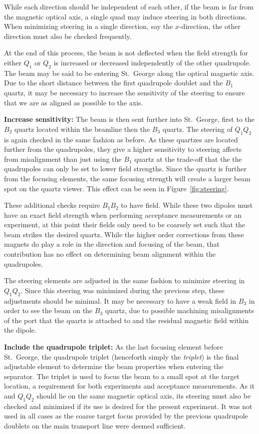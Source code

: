 While each direction should be independent of each other, if the beam is
far from the magnetic optical axis, a single quad may induce steering in
both directions. When minimizing steering in a single direction, say the
$x$-direction, the other direction must also be checked frequently.

At the end of this process, the beam is not deflected when the field
strength for either $Q_1$ or $Q_2$ is increased or decreased
independently of the other quadrupole. The beam may be said to be
entering St.\ George along the optical magnetic axis. Due to the short
distance between the first quadrupole doublet and the $B_1$ quartz, it
may be necessary to increase the sensitivity of the steering to ensure
that we are as aligned as possible to the axis.

\textbf{Increase sensitivity:}
The beam is then sent further into St.\ George, first to the $B_2$
quartz located within the beamline then the $B_3$ quartz. The steering
of $Q_1Q_2$ is again checked in the same fashion as before. As these
quartzes are located further from the quadrupoles, they give a higher
sensitivity to steering affects from misalignment than just using the
$B_1$ quartz at the trade-off that the the quadrupoles can only be set
to lower field strengths. Since the quartz is further from the focusing
elements, the same focusing strength will create a larger beam spot on
the quartz viewer. This effect can be seen in Figure~\ref{fig:steering}.

These additional checks require $B_1B_2$ to have field. While these two
dipoles must have an exact field strength when performing acceptance
measurements or an experiment, at this point their fields only need to
be coarsely set such that the beam strikes the desired quartz. While the
higher order corrections from these magnets do play a role in the
direction and focusing of the beam, that contribution has no effect on
determining beam alignment within the quadrupoles.

The steering elements are adjusted in the same fashion to minimize
steering in $Q_1Q_2$. Since this steering was minimized during the
previous step, these adjustments should be minimal. It may be necessary
to have a weak field in $B_3$ in order to see the beam on the $B_3$
quartz, due to possible machining misalignments of the port that the
quartz is attached to and the residual magnetic field within the dipole.

\textbf{Include the quadrupole triplet:}
As the last focusing element before St.\ George, the quadrupole triplet
(henceforth simply the \emph{triplet}) is the final adjustable element
to determine the beam properties when entering the separator. The
triplet is used to focus the beam to a small spot at the target
location, a requirement for both experiments and acceptance
measurements. As it and $Q_1Q_2$ should lie on the same magnetic optical
axis, its steering must also be checked and minimized if its use is
desired for the present experiment. It was not used in all cases as the
coarse target focus provided by the previous quadrupole doublets on the
main transport line were deemed sufficient.

